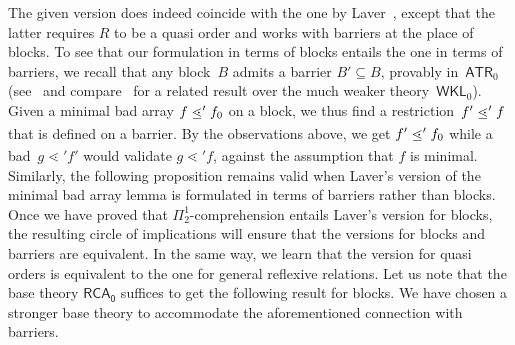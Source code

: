 \documentclass{amsart}
\numberwithin{theorem}{section}
\theoremstyle{definition}
\newcommand\ledot{\mathrel{\ensurestackMath{%
  \stackengine{-.5ex}{\lessdot}{-}{U}{c}{F}{F}{S}}}}
\begin{document}
The given version does indeed coincide with the one by Laver~\cite{laver-min-array}, except that the latter requires $R$ to be a quasi order and works with barriers at the place of blocks. To see that our formulation in terms of blocks entails the one in terms of barriers, we recall that any block~$B$ admits a barrier $B'\subseteq B$, provably in~$\mathsf{ATR}_0$ (see~\cite{marcone-bad-sequence} and compare~\cite{cholak-RM-wpo} for a related result over the much weaker theory~$\mathsf{WKL}_0$). Given a minimal bad array $f\ledot' f_0$ on a block, we thus find a restriction~$f'\ledot' f$ that is defined on a barrier. By the observations above, we get $f'\ledot' f_0$ while a bad~$g\lessdot' f'$ would validate $g\lessdot' f$, against the assumption that $f$ is minimal. Similarly, the following proposition remains valid when Laver's version of the minimal bad array lemma is formulated in terms of barriers rather than blocks. Once we have proved that $\Pi^1_2$-comprehension entails Laver's version for blocks, the resulting circle of implications will ensure that the versions for blocks and barriers are equivalent. In the same way, we learn that the version for quasi orders is equivalent to the one for general reflexive relations. Let us note that the base theory $\mathsf{RCA_0}$ suffices to get the following result for blocks. We have chosen a stronger base theory to accommodate the aforementioned connection with barriers.
\end{document}
